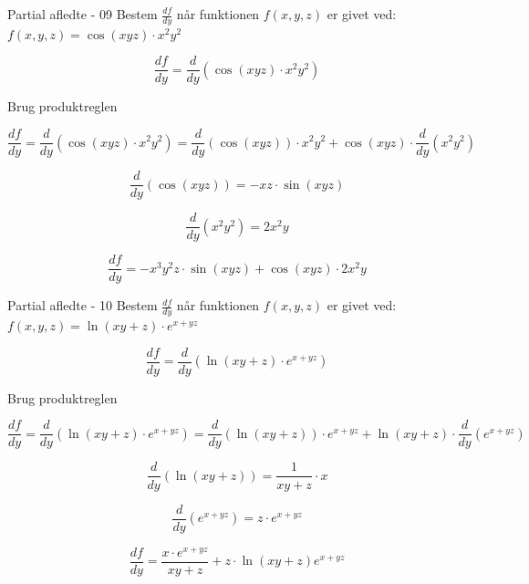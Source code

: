 \documentclass{article}
\begin{document}
\begin{exercise}{Partial afledte - 09}
Bestem $\frac{df}{dy}$ når funktionen $f(x,y,z)$ er givet ved:
$f(x,y,z) = \cos(xyz) \cdot x^2 y^2$


\hint
\[
\frac{df}{dy} = \frac{d}{dy} \left(\cos(xyz) \cdot x^2 y^2\right)
\]

\hint
Brug produktreglen

\hint
\[
\frac{df}{dy} = \frac{d}{dy} \left( \cos(xyz) \cdot x^2 y^2\right) = \frac{d}{dy} \left( \cos(xyz) \right) \cdot x^2 y^2 + \cos(xyz) \cdot \frac{d}{dy}\left( x^2 y^2\right)
\]

\hint
\[
\frac{d}{dy} \left( \cos(xyz) \right) = -xz \cdot \sin(xyz)
\]

\hint
\[
\frac{d}{dy}\left( x^2 y^2\right) =2x^2 y
\]

\hint
\[
\frac{df}{dy} = -x^3y^2 z \cdot \sin(xyz)+ \cos(xyz) \cdot 2x^2 y
\]


\end{exercise}

\begin{exercise}{Partial afledte - 10}
Bestem $\frac{df}{dy}$ når funktionen $f(x,y,z)$ er givet ved:
$f(x,y,z) = \ln(xy + z) \cdot e^{x + yz}$


\hint
\[
\frac{df}{dy} = \frac{d}{dy} \left(\ln(xy + z) \cdot e^{x + yz}\right)
\]

\hint
Brug produktreglen

\hint
\[
\frac{df}{dy} = \frac{d}{dy} \left( \ln(xy + z) \cdot e^{x + yz}\right) = \frac{d}{dy} \left( \ln(xy + z) \right) \cdot e^{x + yz} + \ln(xy + z) \cdot \frac{d}{dy}\left( e^{x + yz} \right)
\]

\hint
\[
\frac{d}{dy} \left( \ln(xy + z)\right) = \frac{1}{xy + z} \cdot x
\]

\hint
\[
\frac{d}{dy}\left( e^{x + yz} \right) = z \cdot e^{x + yz}
\]

\hint
\[
\frac{df}{dy} = \frac{x \cdot e^{x + yz}}{xy + z} + z \cdot \ln(xy + z) e^{x + yz}
\]


\end{exercise}
\end{document}
